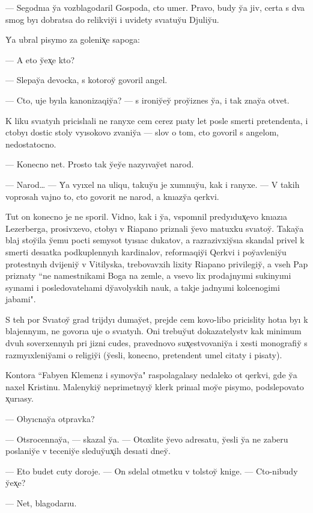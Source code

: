 \documentclass[10pt]{book}
\begin{document}
— Segodnıa y̆a vozblagodaril Gospoda, cto umer. Pravo, budy y̆a jiv, certa s dva smog byı dobratsa do relikviy̆i i uvidety svıatuy̆u Djuliy̆u.

Y̆a ubral pisymo za golenix̨e sapoga:

— A eto y̆ex̨e kto?

— Slepay̆a devocka, s kotoroy̆ govoril angel.

— Cto, uje byıla kanonizaqiy̆a? — s ironiy̆ey̆ proy̆iznes y̆a, i tak znay̆a otvet.

K liku svıatyıh pricislıali ne ranyxe cem cerez pıaty let posle smerti pretendenta, i ctobyı dostic stoly vyısokovo zvaniy̆a — slov o tom, cto govoril s angelom, nedostatocno.

— Konecno net. Prosto tak y̆ey̆e nazyıvay̆et narod.

— Narod… — Y̆a vyıxel na uliqu, takuy̆u je xumnuy̆u, kak i ranyxe. — V takih voprosah vajno to, cto govorit ne narod, a knıazy̆a qerkvi.

Tut on konecno je ne sporil. Vidno, kak i y̆a, vspomnil predyıdux̨evo knıazıa Lezerberga, prosivxevo, ctobyı v Riapano priznali y̆evo matuxku svıatoy̆. Takay̆a blaj stoy̆ila y̆emu pocti semysot tyısıac dukatov, a razrazivxiy̆sıa skandal privel k smerti desıatka podkuplennyıh kardinalov, reformaqiy̆i Qerkvi i poy̆avleniy̆u protestnyıh dvijeniy̆ v Vitilyska, trebovavxih lixity Riapano privilegiy̆, a vseh Pap priznaty ``ne namestnikami Boga na zemle, a vsevo lix prodajnyımi sukinyımi syınami i posledovatelıami dy̆avolyskih nauk, a takje jadnyımi kolcenogimi jabami".

S teh por Svıatoy̆ grad trijdyı dumay̆et, prejde cem kovo-libo pricislity hotıa byı k blajennyım, ne govorıa uje o svıatyıh. Oni trebuy̆ut dokazatelystv kak minimum dvuh soverxennyıh pri jizni cudes, pravednovo sux̨estvovaniy̆a i xesti monografiy̆ s razmyıxleniy̆ami o religiy̆i (y̆esli, konecno, pretendent umel citaty i pisaty).

Kontora ``Fabyen Klemenz i syınovy̆a" raspolagalasy nedaleko ot qerkvi, gde y̆a naxel Kristinu. Malenykiy̆ neprimetnyıy̆ klerk prinıal moy̆e pisymo, podslepovato x̨urıasy.

— Obyıcnay̆a otpravka?

— Otsrocennay̆a, — skazal y̆a. — Otoxlite y̆evo adresatu, y̆esli y̆a ne zaberu poslaniy̆e v teceniy̆e sleduy̆ux̨ih desıati dney̆.

— Eto budet cuty doroje. — On sdelal otmetku v tolstoy̆ knige. — Cto-nibudy y̆ex̨e?

— Net, blagodarıu.
\end{document}
